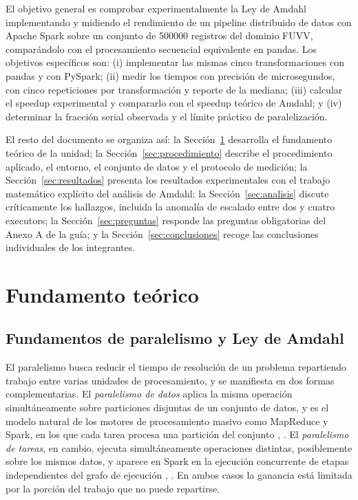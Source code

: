 \documentclass[10pt,journal]{IEEEtran}
\begin{document}
El objetivo general es comprobar experimentalmente la Ley de Amdahl
implementando y midiendo el rendimiento de un pipeline distribuido de datos con
Apache Spark sobre un conjunto de \num{500000} registros del dominio FUVV,
compar\'andolo con el procesamiento secuencial equivalente en pandas. Los
objetivos espec\'ificos son: (i) implementar las mismas cinco transformaciones
con pandas y con PySpark; (ii) medir los tiempos con precisi\'on de
microsegundos, con cinco repeticiones por transformaci\'on y reporte de la
mediana; (iii) calcular el speedup experimental y compararlo con el speedup
te\'orico de Amdahl; y (iv) determinar la fracci\'on serial observada y el
l\'imite pr\'actico de paralelizaci\'on.

El resto del documento se organiza as\'i: la Secci\'on~\ref{sec:fundamento}
desarrolla el fundamento te\'orico de la unidad; la
Secci\'on~\ref{sec:procedimiento} describe el procedimiento aplicado, el
entorno, el conjunto de datos y el protocolo de medici\'on; la
Secci\'on~\ref{sec:resultados} presenta los resultados experimentales con el
trabajo matem\'atico expl\'icito del an\'alisis de Amdahl; la
Secci\'on~\ref{sec:analisis} discute cr\'iticamente los hallazgos, incluida la
anomal\'ia de escalado entre dos y cuatro executors; la
Secci\'on~\ref{sec:preguntas} responde las preguntas obligatorias del Anexo A de
la gu\'ia; y la Secci\'on~\ref{sec:conclusiones} recoge las conclusiones
individuales de los integrantes.

\section{Fundamento te\'orico}
\label{sec:fundamento}

\subsection{Fundamentos de paralelismo y Ley de Amdahl}
\label{sec:amdahl}
El paralelismo busca reducir el tiempo de resoluci\'on de un problema
repartiendo trabajo entre varias unidades de procesamiento, y se manifiesta en
dos formas complementarias. El \emph{paralelismo de datos} aplica la misma
operaci\'on simult\'aneamente sobre particiones disjuntas de un conjunto de
datos, y es el modelo natural de los motores de procesamiento masivo como
MapReduce y Spark, en los que cada tarea procesa una partici\'on del conjunto
\cite{dean2008}, \cite{zaharia2016}. El \emph{paralelismo de tareas}, en cambio,
ejecuta simult\'aneamente operaciones distintas, posiblemente sobre los mismos
datos, y aparece en Spark en la ejecuci\'on concurrente de etapas independientes
del grafo de ejecuci\'on \cite{zaharia2016}, \cite{armbrust2015}. En ambos casos
la ganancia est\'a limitada por la porci\'on del trabajo que no puede repartirse.
\end{document}
